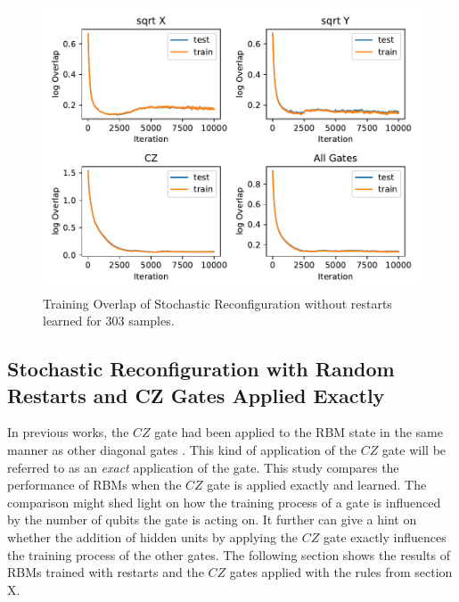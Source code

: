 \begin{figure}[H]
  \centering
  \includegraphics[width=\textwidth]{figures/results/SR-no-restarts-learned/avgOverlap_303.pdf}
  \caption[Training and Testing Overlaps for Stochastic Reconfiguration without Random Restarts and $CZ$ Gates Learned - 303 Samples]{Training 
  Overlap of Stochastic Reconfiguration without restarts learned for 303 samples.}
  \label{fig:sr_no_restarts_overlap_303}
\end{figure}

\newpage

\subsection{Stochastic Reconfiguration with Random Restarts and CZ Gates Applied Exactly}

In previous works, the $CZ$ gate had been applied to the RBM state in the same manner as 
other diagonal gates \cite{jnsson2018neuralnetwork}. This kind of application of the $CZ$ gate 
will be referred to as an \textit{exact} application of the gate. This study compares 
the performance of RBMs when the $CZ$ gate is applied exactly and learned. The comparison might shed
light on how the training process of a gate is influenced by the number of qubits the gate 
is acting on. It further can give a hint on whether the addition of hidden units by applying the $CZ$
gate exactly influences the training process of the other gates.
The following section shows the results of RBMs trained with restarts and the $CZ$ gates applied 
with the rules from section X.

